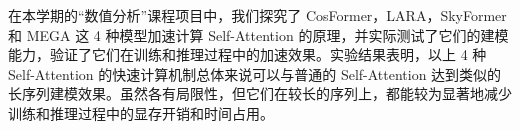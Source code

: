 在本学期的“数值分析”课程项目中，我们探究了 CosFormer，LARA，SkyFormer 和 MEGA 这 4 种模型加速计算 Self-Attention 的原理，并实际测试了它们的建模能力，验证了它们在训练和推理过程中的加速效果。实验结果表明，以上 4 种 Self-Attention 的快速计算机制总体来说可以与普通的 Self-Attention 达到类似的长序列建模效果。虽然各有局限性，但它们在较长的序列上，都能较为显著地减少训练和推理过程中的显存开销和时间占用。
